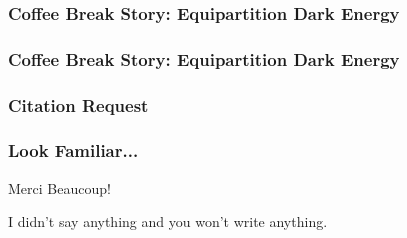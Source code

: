 \documentclass[CJK]{beamer}
\begin{document}
\begin{frame}
  \frametitle{Coffee Break Story: Equipartition Dark Energy}
\end{frame}


\begin{frame}
  \frametitle{Coffee Break Story: Equipartition Dark Energy}
\end{frame}


\begin{frame}
  \frametitle{Citation Request}
\end{frame}


\begin{frame}
  \frametitle{Look Familiar...}
\end{frame}

\begin{frame}
\end{frame}


\begin{frame}

  \begin{center}
    
  {\Huge Merci Beaucoup!}

  \skiplines
  
  {\large I didn't say anything and you won't write anything.}
  \end{center}

\end{frame}
\end{document}
